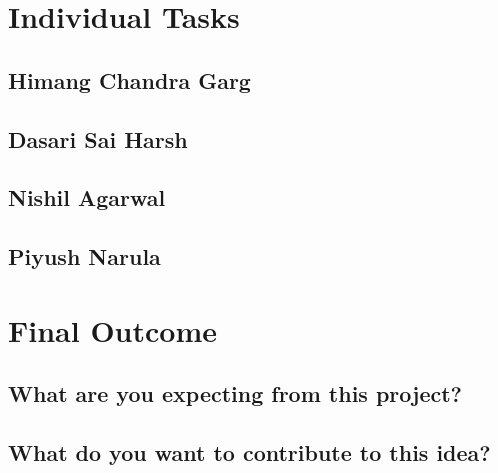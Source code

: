 \documentclass[10pt,twocolumn,letterpaper]{article}
\begin{document}
\section{Individual Tasks}

\subsection{Himang Chandra Garg}

\subsection{Dasari Sai Harsh}

\subsection{Nishil Agarwal}

\subsection{Piyush Narula}

\section{Final Outcome}

\subsection{What are you expecting from this project?}

\subsection{What do you want to contribute to this idea?}
\end{document}
